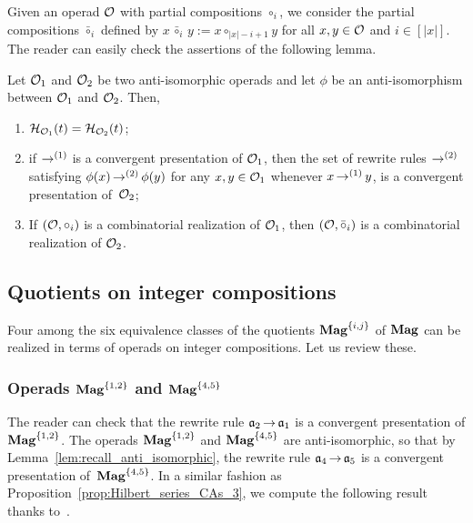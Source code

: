 Given an operad $\mathcal{O}$ with partial compositions $\circ_i$, we consider
the partial compositions $\bar{\circ}_i$ defined by
\begin{math}
  x \, \bar{\circ}_i \, y := x \circ_{|x| - i + 1} y
\end{math}
for all $x, y \in \mathcal{O}$ and $i \in [|x|]$. The reader can easily check
the assertions of the following lemma.
\medbreak

\begin{Lemma} \label{lem:recall_anti_isomorphic}
    Let $\mathcal{O}_1$ and $\mathcal{O}_2$ be two anti-isomorphic operads and let
    $\phi$ be an anti-isomorphism between $\mathcal{O}_1$ and $\mathcal{O}_2$. Then,
    \begin{enumerate}[label={(\it\roman*)}]
        \item \label{item:recall_anti_isomorphic_1}
        $\mathcal{H}_{\mathcal{O}_1}(t) = \mathcal{H}_{\mathcal{O}_2}(t)$;
        \item \label{item:recall_anti_isomorphic_2}
        if $\operatorname{\to}^{(1)}$ is a convergent presentation of $\mathcal{O}_1$, then
        the set of rewrite rules $\operatorname{\to}^{(2)}$ satisfying
        $\phi(x) \operatorname{\to}^{(2)} \phi(y)$ for any $x, y \in \mathcal{O}_1$ whenever
        $x \operatorname{\to}^{(1)} y$, is a convergent presentation of~$\mathcal{O}_2$;
        \item\label{item:realization_anti_isomorphic}
        If $\left(\mathcal{O}, \circ_i\right)$ is a combinatorial realization
        of $\mathcal{O}_1$, then
        \begin{math}
          \left(\mathcal{O}, \bar{\circ}_i\right)
        \end{math}
        is a combinatorial realization of $\mathcal{O}_2$.
    \end{enumerate}
\end{Lemma}
\medbreak

\subsection{Quotients on integer compositions}
Four among the six equivalence classes of the quotients
$\mathbf{Mag}^{\{i, j\}}$ of $\mathbf{Mag}$ can be realized in terms of operads on
integer compositions. Let us review these.
\medbreak

\subsubsection{Operads $\mathbf{Mag}^{\{1, 2\}}$ and $\mathbf{Mag}^{\{4, 5\}}$}
\label{subsubsec:Mag_1_2}
The reader can check that the rewrite rule $\mathfrak{a}_2 \operatorname{\to} \mathfrak{a}_1$ is a
convergent presentation of $\mathbf{Mag}^{\{1, 2\}}$. The operads
$\mathbf{Mag}^{\{1, 2\}}$ and $\mathbf{Mag}^{\{4, 5\}}$ are anti-isomorphic, so that
by Lemma~\ref{lem:recall_anti_isomorphic}, the rewrite rule
$\mathfrak{a}_4 \operatorname{\to} \mathfrak{a}_5$ is a convergent presentation of~$\mathbf{Mag}^{\{4, 5\}}$.
In a similar fashion as Proposition~\ref{prop:Hilbert_series_CAs_3}, we
compute the following result thanks to~\cite{Gir18}.
\medbreak

